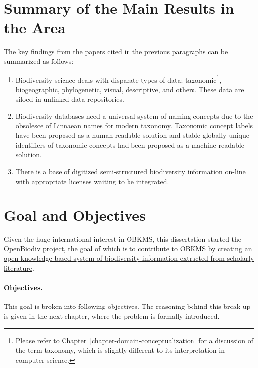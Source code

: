 
\section{Summary of the Main Results in the Area}

The key findings from the papers cited in the previous paragraphs can be summarized as follows:

\begin{enumerate}
\item{Biodiversity science deals with disparate types of data: taxonomic\footnote{Please refer to Chapter~\ref{chapter-domain-conceptualization} for a discussion of the term taxonomy, which is slightly different to its interpretation in computer science.}, biogeographic, phylogenetic, visual, descriptive, and others. These data are siloed in unlinked data repositories.}
\item{Biodiversity databases need a universal system of naming concepts due to the obsolesce of Linnaean names for modern taxonomy. Taxonomic concept labels have been proposed as a human-readable solution and stable globally unique identifiers of taxonomic concepts had been proposed as a machine-readable solution.}
\item{There is a base of digitized semi-structured biodiversity information on-line with appropriate licenses waiting to be integrated.}
\end{enumerate}


\section{Goal and Objectives}

Given the huge international interest in OBKMS, this dissertation started the OpenBiodiv project, the goal of which is to contribute to OBKMS by creating an \ul{open knowledge-based system of biodiversity information extracted from scholarly literature}.

\paragraph{Objectives.} This goal is broken into following objectives. The reasoning behind this break-up is given in the next chapter, where the problem is formally introduced.

